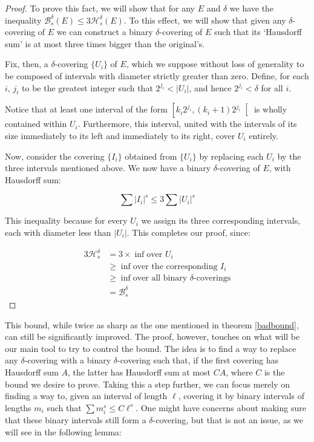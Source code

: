 \documentclass[11pt, reqno]{amsart}
\newcommand{\HH}{\mathcal{H}}
\newcommand{\BB}{\mathcal{B}}
\begin{document}
\begin{proof}
To prove this fact, we will show that for any $E$ and $\delta$ we have the inequality $\BB_s^\delta(E) \leq 3 \HH_s^\delta(E)$. To this effect, we will show that given any $\delta$-covering of $E$ we can construct a binary $\delta$-covering of $E$ such that its `Hausdorff sum' is at most three times bigger than the original's.

Fix, then, a $\delta$-covering $\{U_i\}$ of $E$, which we suppose without loss of generality to be composed of intervals with diameter strictly greater than zero. Define, for each $i$, $j_i$ to be the greatest integer such that $2^{j_i} < \lvert U_i \rvert$, and hence $2^{j_i} < \delta$ for all $i$.

Notice that at least one interval of the form $\left[ k_i 2^{j_i}, (k_i + 1) 2^{j_i} \right[$ is wholly contained within $U_i$. Furthermore, this interval, united with the intervals of its size immediately to its left and immediately to its right, cover $U_i$ entirely.

Now, consider the covering $\{I_i\}$ obtained from $\{U_i\}$ by replacing each $U_i$ by the three intervals mentioned above. We now have a binary $\delta$-covering of $E$, with Hausdorff sum:

\[\sum \lvert I_i \rvert^s \leq 3 \sum \lvert U_i \rvert^s\]

This inequality because for every $U_i$ we assign its three corresponding intervals, each with diameter less than $\lvert U_i \rvert$. This completes our proof, since:

\begin{align*}
3 \HH_s^\delta &= 3 \times \inf \text{over $U_i$}\\
&\geq \inf \text{over the corresponding $I_i$}\\
&\geq \inf \text{over all binary $\delta$-coverings}\\
&= \BB_s^\delta
\end{align*}

\end{proof}

This bound, while twice as sharp as the one mentioned in theorem \ref{badbound}, can still be significantly improved. The proof, however, touches on what will be our main tool to try to control the bound. The idea is to find a way to replace any $\delta$-covering with a binary $\delta$-covering such that, if the first covering has Hausdorff sum $A$, the latter has Hausdorff sum at most $CA$, where $C$ is the bound we desire to prove. Taking this a step further, we can focus merely on finding a way to, given an interval of length $\ell$, covering it by binary intervals of lengths $m_i$ such that $\sum m_i^s \leq C \ell^s$. One might have concerns about making sure that these binary intervals still form a $\delta$-covering, but that is not an issue, as we will see in the following lemma:
\end{document}
